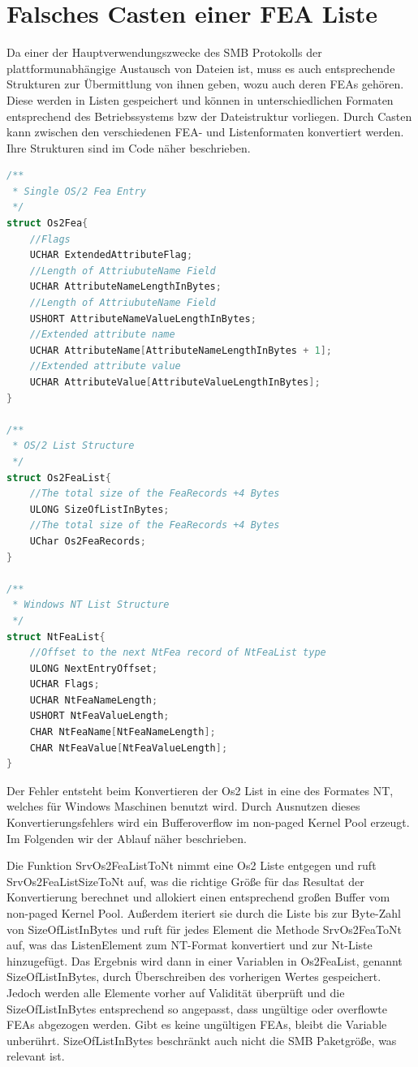 \documentclass[DIV=12,headings=normal,pdftex,headinclude=false,footinclude=false,final]{scrreprt}
\begin{document}
\section{Falsches Casten einer FEA Liste}
Da einer der Hauptverwendungszwecke des SMB Protokolls der plattformunabhängige Austausch von Dateien  ist, muss es auch entsprechende Strukturen zur Übermittlung von ihnen geben, wozu auch deren FEAs gehören. Diese werden in Listen gespeichert und können in unterschiedlichen Formaten entsprechend des Betriebssystems bzw der Dateistruktur vorliegen. Durch Casten kann zwischen den verschiedenen FEA- und Listenformaten konvertiert werden. Ihre Strukturen sind im Code näher beschrieben\cite{CP}.

\begin{lstlisting}[language=C,caption={My Caption},captionpos=b]
/**
 * Single OS/2 Fea Entry
 */
struct Os2Fea{
    //Flags
    UCHAR ExtendedAttributeFlag;
    //Length of AttriubuteName Field
    UCHAR AttributeNameLengthInBytes; 
    //Length of AttriubuteName Field
    USHORT AttributeNameValueLengthInBytes;
    //Extended attribute name
    UCHAR AttributeName[AttributeNameLengthInBytes + 1];
    //Extended attribute value
    UCHAR AttributeValue[AttributeValueLengthInBytes]; 
}
 
/**
 * OS/2 List Structure
 */
struct Os2FeaList{
    //The total size of the FeaRecords +4 Bytes
    ULONG SizeOfListInBytes; 
    //The total size of the FeaRecords +4 Bytes
    UChar Os2FeaRecords;
}
 
/**
 * Windows NT List Structure
 */
struct NtFeaList{
    //Offset to the next NtFea record of NtFeaList type
    ULONG NextEntryOffset;
    UCHAR Flags; 
    UCHAR NtFeaNameLength;
    USHORT NtFeaValueLength;
    CHAR NtFeaName[NtFeaNameLength];
    CHAR NtFeaValue[NtFeaValueLength];
}
\end{lstlisting}

\noindent
Der Fehler entsteht beim Konvertieren der Os2 List in eine des Formates NT, welches für Windows Maschinen benutzt wird. Durch Ausnutzen dieses Konvertierungsfehlers wird ein Bufferoverflow im non-paged Kernel Pool erzeugt. Im Folgenden wir der Ablauf näher beschrieben.

\noindent
Die Funktion SrvOs2FeaListToNt nimmt eine Os2 Liste entgegen und ruft SrvOs2FeaListSizeToNt auf, was die richtige Größe für das Resultat der Konvertierung berechnet und allokiert einen entsprechend großen Buffer vom non-paged Kernel Pool. Außerdem iteriert sie durch die Liste bis zur Byte-Zahl von SizeOfListInBytes und ruft für jedes Element die Methode SrvOs2FeaToNt auf, was das ListenElement zum NT-Format konvertiert und zur Nt-Liste hinzugefügt. Das Ergebnis wird dann in einer Variablen in Os2FeaList, genannt SizeOfListInBytes, durch Überschreiben des vorherigen Wertes gespeichert. Jedoch werden alle Elemente vorher auf Validität überprüft und die SizeOfListInBytes entsprechend so angepasst, dass ungültige oder overflowte FEAs abgezogen werden. Gibt es keine ungültigen FEAs, bleibt die Variable unberührt. SizeOfListInBytes beschränkt auch nicht die SMB Paketgröße, was relevant ist.
\end{document}
